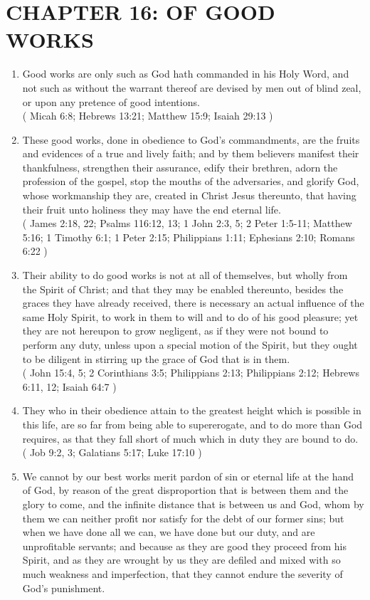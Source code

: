 \documentclass[12pt,a4paper]{book}
\begin{document}
\chapter{CHAPTER 16: OF GOOD WORKS}
\label{ch-good-wor}
\begin{enumerate}
\item Good works are only such as God hath commanded in his Holy Word, and not such as without the warrant thereof are devised by men out of blind zeal, or upon any pretence of good intentions.\\
( Micah 6:8; Hebrews 13:21; Matthew 15:9; Isaiah 29:13 )
\item These good works, done in obedience to God's commandments, are the fruits and evidences of a true and lively faith; and by them believers manifest their thankfulness, strengthen their assurance, edify their brethren, adorn the profession of the gospel, stop the mouths of the adversaries, and glorify God, whose workmanship they are, created in Christ Jesus thereunto, that having their fruit unto holiness they may have the end eternal life.\\
( James 2:18, 22; Psalms 116:12, 13; 1 John 2:3, 5; 2 Peter 1:5-11; Matthew 5:16; 1 Timothy 6:1; 1 Peter 2:15; Philippians 1:11; Ephesians 2:10; Romans 6:22 )
\item Their ability to do good works is not at all of themselves, but wholly from the Spirit of Christ; and that they may be enabled thereunto, besides the graces they have already received, there is necessary an actual influence of the same Holy Spirit, to work in them to will and to do of his good pleasure; yet they are not hereupon to grow negligent, as if they were not bound to perform any duty, unless upon a special motion of the Spirit, but they ought to be diligent in stirring up the grace of God that is in them.\\
( John 15:4, 5; 2 Corinthians 3:5; Philippians 2:13; Philippians 2:12; Hebrews 6:11, 12; Isaiah 64:7 )
\item They who in their obedience attain to the greatest height which is possible in this life, are so far from being able to supererogate, and to do more than God requires, as that they fall short of much which in duty they are bound to do.\\
( Job 9:2, 3; Galatians 5:17; Luke 17:10 )
\item We cannot by our best works merit pardon of sin or eternal life at the hand of God, by reason of the great disproportion that is between them and the glory to come, and the infinite distance that is between us and God, whom by them we can neither profit nor satisfy for the debt of our former sins; but when we have done all we can, we have done but our duty, and are unprofitable servants; and because as they are good they proceed from his Spirit, and as they are wrought by us they are defiled and mixed with so much weakness and imperfection, that they cannot endure the severity of God's punishment.\\

\end{enumerate}
\end{document}
